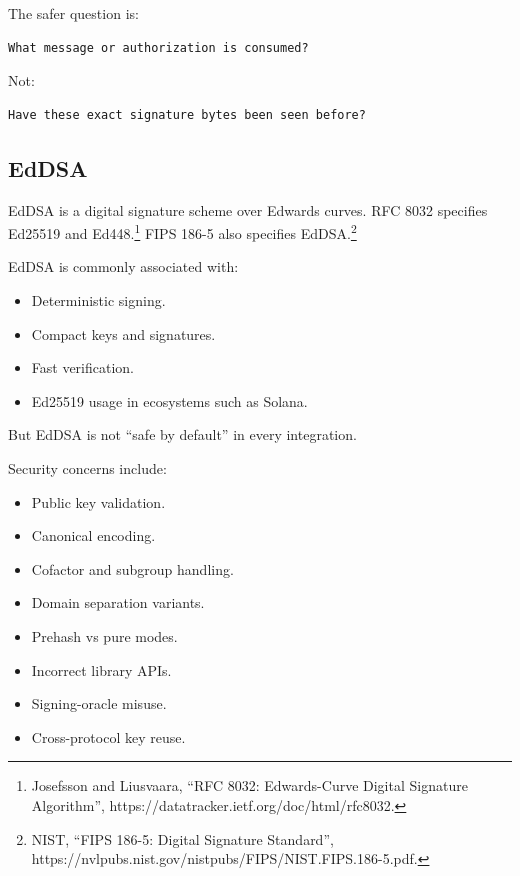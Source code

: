 The safer question is:

\begin{lstlisting}
What message or authorization is consumed?
\end{lstlisting}

Not:

\begin{lstlisting}
Have these exact signature bytes been seen before?
\end{lstlisting}

\subsection{EdDSA}

EdDSA is a digital signature scheme over Edwards curves. RFC 8032
specifies Ed25519 and Ed448.\footnote{Josefsson and Liusvaara, ``RFC
  8032: Edwards-Curve Digital Signature Algorithm'',
  https://datatracker.ietf.org/doc/html/rfc8032.} FIPS 186-5 also
specifies EdDSA.\footnote{NIST, ``FIPS 186-5: Digital Signature
  Standard'',
  https://nvlpubs.nist.gov/nistpubs/FIPS/NIST.FIPS.186-5.pdf.}

EdDSA is commonly associated with:

\begin{itemize}
\tightlist
\item
  Deterministic signing.
\item
  Compact keys and signatures.
\item
  Fast verification.
\item
  Ed25519 usage in ecosystems such as Solana.
\end{itemize}

But EdDSA is not ``safe by default'' in every integration.

Security concerns include:

\begin{itemize}
\tightlist
\item
  Public key validation.
\item
  Canonical encoding.
\item
  Cofactor and subgroup handling.
\item
  Domain separation variants.
\item
  Prehash vs pure modes.
\item
  Incorrect library APIs.
\item
  Signing-oracle misuse.
\item
  Cross-protocol key reuse.
\end{itemize}

